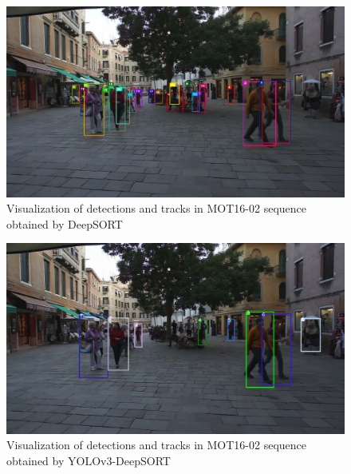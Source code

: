 \begin{figure}[h!]
    \centering
    \includegraphics[width=\textwidth]{Chapters/Fig/mot02_org_1.jpg}
    \caption{Visualization of detections and tracks in MOT16-02 sequence obtained by DeepSORT\cite{Wojke2017simple}}
    \label{fig:mot02_org_1}
\end{figure}

\begin{figure}[h!]
    \centering
    \includegraphics[width=\textwidth]{Chapters/Fig/mot02_yolo_1.jpg}
    \caption{Visualization of detections and tracks in MOT16-02 sequence obtained by YOLOv3-DeepSORT}
    \label{fig:mot02_yolo_1}
\end{figure}

